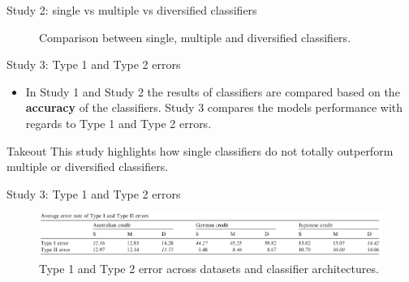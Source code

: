 \documentclass[12pt]{beamer}
\begin{document}
\begin{frame}{Study 2: single vs multiple vs diversified classifiers}
  \begin{figure}
    \centering
    \hfill
    \hfill
    \caption{Comparison between single, multiple and diversified classifiers.}
\end{figure}
\end{frame}



\begin{frame}{Study 3: Type 1 and Type 2 errors}
  \begin{itemize}
    \item In Study 1 and Study 2 the results of classifiers are compared based on
      the \textbf{accuracy} of the classifiers. Study 3 compares the models
      performance with regards to Type 1 and Type 2 errors.
  \end{itemize}

  \begin{block}{Takeout}
    This study highlights how single classifiers do not totally outperform multiple
    or diversified classifiers.
  \end{block}
\end{frame}

\begin{frame}{Study 3: Type 1 and Type 2 errors}
  \begin{figure}
    \centering
    \includegraphics[width=1\linewidth]{images/error.png}
    \caption{Type 1 and Type 2 error across datasets and classifier architectures.}
\end{figure}
\end{frame}
\end{document}
